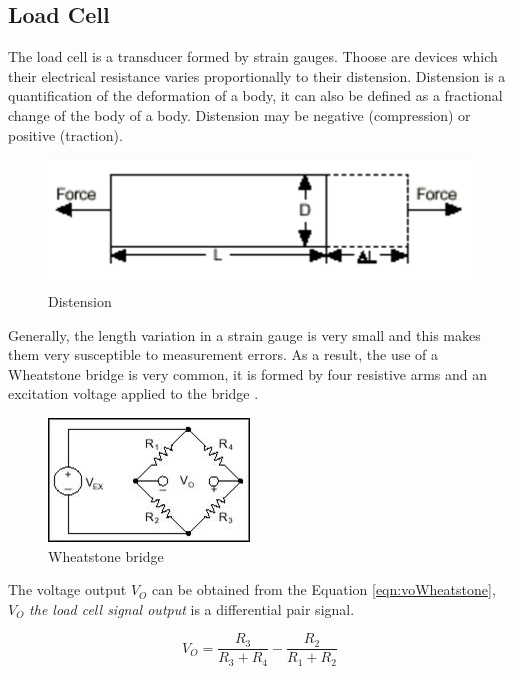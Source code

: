 \subsection{Load Cell}\label{ssec:load-cell}

	The load cell is a transducer formed by strain gauges. Thoose are devices which their electrical resistance varies proportionally to their distension. Distension is a quantification of the deformation of a body, it can also be defined as a fractional change of the body of a body. Distension may be negative (compression) or positive (traction).

	\begin{figure}[htbp]
		\centering
			\includegraphics[scale=0.6]{figuras/fig-distension.png}
		\caption{Distension \cite{strain-def}}
		\label{fig:distension}
	\end{figure}

	Generally, the length variation in a strain gauge is very small and this makes them very susceptible to measurement errors. As a result, the use of a Wheatstone bridge is very common, it is formed by four resistive arms and an excitation voltage applied to the bridge \cite{window1982strain}.

	\begin{figure}[htbp]
		\centering
			\includegraphics[scale=1.45]{figuras/fig-wheatstone.jpg}
		\caption{Wheatstone bridge \cite{wheat-bridge}}
		\label{fig:wheatstone}
	\end{figure}

	The voltage output $V_{O}$ can be obtained from the Equation \ref{eqn:voWheatstone}, $V_{O}$ \textit{the load cell signal output} is a differential pair signal.

	\begin{equation}\label{eqn:voWheatstone}
		V_{O}=\frac{ R_{3} }{ R_{3} + R_{4} } - \frac{ R_{2} }{ R_{1} + R_{2}}
	\end{equation}

